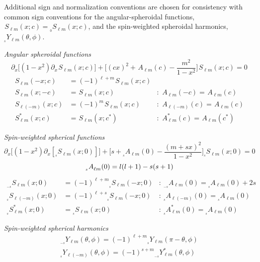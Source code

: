 \documentclass[11pt]{article}
\newcommand{\swY}[4][]{{}_{{}_{#2}}\!Y^{#1}_{#3}(#4)}
\newcommand{\swS}[5][]{{}_{{}_{#2}}S^{#1}_{#3}(#4;#5)}
\newcommand{\scA}[4][]{{}_{{}_{#2}}A^{#1}_{#3}(#4)}
\begin{document}
Additional sign and normalization conventions are chosen for
consistency with common sign conventions for the angular-spheroidal
functions, $\swS{}{\ell{m}}{x}{c} = \swS{0}{\ell{m}}{x}{c}$, and the
spin-weighted spheroidal harmonics, $\swY{s}{\ell{m}}{\theta,\phi}$.

\vspace{0.25in}
\noindent
{\it Angular spheroidal functions}
\begin{equation}
\partial_x \Big[ (1-x^2)\partial_x \swS{}{\ell{m}}{x}{c}\Big] + \bigg[(cx)^2 + \scA{}{\ell{m}}{c} - \frac{m^2}{1-x^2}\bigg]\swS{}{\ell{m}}{x}{c} = 0
\end{equation}
\begin{align}
\swS{}{\ell{m}}{-x}{c} &= (-1)^{\ell+m}\swS{}{\ell{m}}{x}{c}& \\
\swS{}{\ell{m}}{x}{-c} &= \swS{}{\ell{m}}{x}{c} 
           &:\ \scA{}{\ell{m}}{-c} = \scA{}{\ell{m}}{c} \\
\swS{}{\ell(-m)}{x}{c} &= (-1)^m\swS{}{\ell{m}}{x}{c} 
           &:\ \scA{}{\ell(-m)}{c} = \scA{}{\ell{m}}{c} \\
\swS[*]{}{\ell{m}}{x}{c} &= \swS{}{\ell{m}}{x}{c^*} 
           &:\ \scA[*]{}{\ell{m}}{c} = \scA{}{\ell{m}}{c^*}
\end{align}

\noindent
{\it Spin-weighted spherical functions}
\begin{equation}\label{Eqn:swSF:Diff_eqn0}
\partial_x \Big[ (1-x^2)\partial_x [\swS{s}{\ell{m}}{x}{0}]\Big] + \bigg[s + \scA{s}{\ell{m}}{0} - \frac{(m+sx)^2}{1-x^2}\bigg]\swS{s}{\ell{m}}{x}{0} = 0
\end{equation}
\begin{equation}\label{eqn:scA_spherical}
\scA{s}{\ell{m}}{0} = l(l+1) - s(s+1)\\
\end{equation}
\begin{align}
\swS{-s}{\ell{m}}{x}{0} &= (-1)^{\ell+m}\swS{s}{\ell{m}}{-x}{0} 
           &:\ \scA{-s}{\ell{m}}{0} = \scA{s}{\ell{m}}{0} + 2s \\
\swS{s}{\ell(-m)}{x}{0} &= (-1)^{\ell+s}\swS{s}{\ell{m}}{-x}{0} 
           &:\ \scA{s}{\ell(-m)}{0} = \scA{s}{\ell{m}}{0} \\
\swS[*]{s}{\ell{m}}{x}{0} &= \swS{s}{\ell{m}}{x}{0} 
           &:\ \scA[*]{s}{\ell{m}}{0} = \scA{s}{\ell{m}}{0}
\end{align}

\noindent
{\it Spin-weighted spherical harmonics}
\begin{align}\label{eqn:swYminuss}
\swY{-s}{\ell{m}}{\theta,\phi}=(-1)^{\ell+m}\swY{s}{\ell{m}}{\pi-\theta,\phi} \\ \label{eqn:swYminusm}
\swY{s}{\ell(-m)}{\theta,\phi}=(-1)^{s+m}\swY[*]{-s}{\ell{m}}{\theta,\phi}
\end{align}
\end{document}
